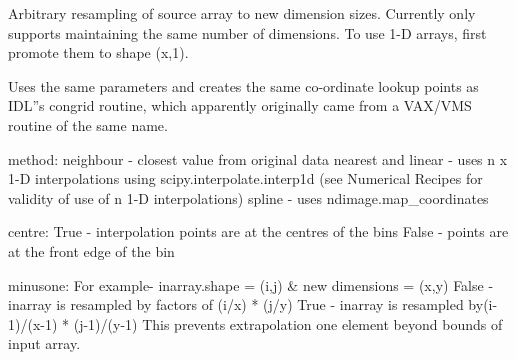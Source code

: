 \documentclass[a4paper,11pt,english]{sphinxmanual}
\begin{document}
\begin{fulllineitems}
\label{support:support.imageManipulation.congrid}
Arbitrary resampling of source array to new dimension sizes.
Currently only supports maintaining the same number of dimensions.
To use 1-D arrays, first promote them to shape (x,1).

Uses the same parameters and creates the same co-ordinate lookup points
as IDL''s congrid routine, which apparently originally came from a VAX/VMS
routine of the same name.

method:
neighbour - closest value from original data
nearest and linear - uses n x 1-D interpolations using scipy.interpolate.interp1d
(see Numerical Recipes for validity of use of n 1-D interpolations)
spline - uses ndimage.map\_coordinates

centre:
True - interpolation points are at the centres of the bins
False - points are at the front edge of the bin

minusone:
For example- inarray.shape = (i,j) \& new dimensions = (x,y)
False - inarray is resampled by factors of (i/x) * (j/y)
True - inarray is resampled by(i-1)/(x-1) * (j-1)/(y-1)
This prevents extrapolation one element beyond bounds of input array.

\end{fulllineitems}

\end{document}
